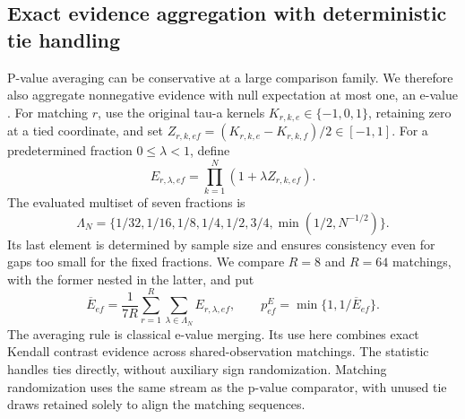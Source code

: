 \subsection{Exact evidence aggregation with deterministic tie handling}\label{sec:evalues}
P-value averaging can be conservative at a large comparison family. We therefore also aggregate nonnegative evidence with null expectation at most one, an e-value \citep{vovk2021}. For matching $r$, use the original tau-a kernels $K_{r,k,e}\in\{-1,0,1\}$, retaining zero at a tied coordinate, and set $Z_{r,k,ef}=(K_{r,k,e}-K_{r,k,f})/2\in[-1,1]$. For a predetermined fraction $0\le\lambda<1$, define
\[
 E_{r,\lambda,ef}=\prod_{k=1}^N(1+\lambda Z_{r,k,ef}).
\]
The evaluated multiset of seven fractions is
\[
 \Lambda_N=\{1/32,1/16,1/8,1/4,1/2,3/4,\min(1/2,N^{-1/2})\}.
\]
Its last element is determined by sample size and ensures consistency even for gaps too small for the fixed fractions. We compare $R=8$ and $R=64$ matchings, with the former nested in the latter, and put
\begin{equation}\label{eq:evalue}
 \overline E_{ef}=\frac1{7R}\sum_{r=1}^R\sum_{\lambda\in\Lambda_N}E_{r,\lambda,ef},\qquad
 p^E_{ef}=\min\{1,1/\overline E_{ef}\}.
\end{equation}
The averaging rule is classical e-value merging. Its use here combines exact Kendall contrast evidence across shared-observation matchings. The statistic handles ties directly, without auxiliary sign randomization. Matching randomization uses the same stream as the p-value comparator, with unused tie draws retained solely to align the matching sequences.

